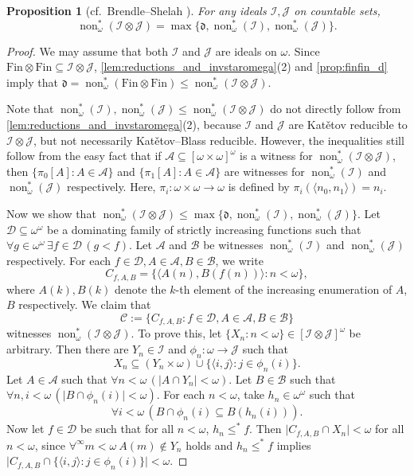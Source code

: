 \documentclass[a4paper,12pt]{amsart}
\newtheorem{prop}[thm]{Proposition}
\theoremstyle{definition}
\numberwithin{thm}{section}
\numberwithin{equation}{section}
\newcommand{\dd}{\mathfrak{d}}
\DeclareMathOperator{\non}{non}
\newcommand{\I}{\mathscr{I}}
\newcommand{\J}{\mathscr{J}}
\newcommand{\finfin}{\mathrm{Fin}\otimes\mathrm{Fin}}
\renewcommand{\subset}{\subseteq}
\begin{document}
    \begin{prop}[cf.\ Brendle--Shelah {\cite[Proposition 5.1(d)]{BS99}}]\label{prop:nonstar_omega_of_Fubini_prod}
        For any ideals $\I, \J$ on countable sets,
        \[
        \non^*_\omega(\I\otimes\J) = \max\{\dd, \non^*_\omega(\I), \non^*_\omega(\J)\}.
        \]
    \end{prop}
    \begin{proof}
        We may assume that both $\I$ and $\J$ are ideals on $\omega$.
        Since $\finfin\subset\I\otimes\J$, \cref{lem:reductions_and_invstaromega}(2) and \cref{prop:finfin_d} imply that $\dd = \non^*_\omega(\finfin)\leq\non^*_\omega(\I\otimes\J)$.
    
        Note that $\non^*_\omega(\I), \non^*_\omega(\J)\leq\non^*_\omega(\I\otimes\J)$ do not directly follow from \cref{lem:reductions_and_invstaromega}(2), because $\I$ and $\J$ are Kat\v{e}tov reducible to $\I\otimes\J$, but not necessarily Kat\v{e}tov--Blass reducible.
        However, the inequalities still follow from the easy fact that if $\mathcal{A}\subset[\omega\times\omega]^\omega$ is a witness for $\non^*_\omega(\I\otimes\J)$, then $\{\pi_0[A]:A\in\mathcal{A}\}$ and $\{\pi_1[A]:A\in\mathcal{A}\}$ are witnesses for $\non^*_\omega(\I)$ and $\non^*_\omega(\J)$ respectively. Here, $\pi_i\colon\omega\times\omega\to\omega$ is defined by $\pi_i(\langle n_0, n_1\rangle) = n_i$.
        
        Now we show that $\non^*_\omega(\I\otimes\J) \leq \max\{\dd, \non^*_\omega(\I), \non^*_\omega(\J)\}$.
        Let $\mathcal{D}\subset\omega^\omega$ be a dominating family of strictly increasing functions such that $\forall g\in\omega^\omega\,\exists f\in\mathcal{D}\,(g<f)$. Let $\mathcal{A}$ and $\mathcal{B}$ be witnesses $\non^*_{\omega}(\I)$ and $\non^*_{\omega}(\J)$ respectively. For each $f\in\mathcal{D}, A\in\mathcal{A}, B\in\mathcal{B}$, we write
        \[
        C_{f, A, B} = \{\langle A(n), B(f(n))\rangle: n<\omega\},
        \]
        where $A(k), B(k)$ denote the $k$-th element of the increasing enumeration of $A$, $B$ respectively. We claim that
        \[
        \mathcal{C} := \{C_{f, A, B}: f\in\mathcal{D}, A\in\mathcal{A}, B\in\mathcal{B}\}
        \]
        witnesses $\non^*_{\omega}(\I\otimes\J)$. To prove this, let $\{ X_n:n<\omega\}\in[\I\otimes\J]^{\omega}$ be arbitrary. Then there are $Y_n\in\I$ and $\phi_n\colon\omega\to\J$ such that
        \[
        X_n\subset(Y_n\times\omega)\cup\{\langle i, j\rangle:j\in\phi_n(i)\}.
        \]
        Let $A\in\mathcal{A}$ such that $\forall n<\omega\,(\lvert A\cap Y_n\rvert<\omega)$. 
        Let $B\in\mathcal{B}$ such that $\forall n, i<\omega\,(\lvert B\cap\phi_n(i)\rvert<\omega)$. For each $n<\omega$, take $h_n\in\omega^\omega$ such that 
        \[
        \forall i<\omega\,(B\cap\phi_n(i)\subset B(h_n(i))).
        \]
        Now let $f\in\mathcal{D}$ be such that 
        for all $n<\omega$, $h_n\leq^* f$. Then $\lvert C_{f, A, B}\cap X_n\rvert<\omega$ for all $n<\omega$, since 
        $\forall^\infty m<\omega~A(m)\notin Y_n$ holds and 
        $h_n\leq^* f$ implies $\lvert C_{f, A, B}\cap\{\langle i, j\rangle: j\in\phi_n(i)\}\rvert < \omega$.
    \end{proof}
\end{document}
